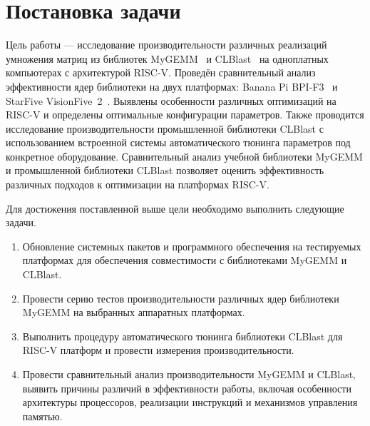 
\section{Постановка задачи}
\label{sec:task}

Цель работы --- исследование производительности различных реализаций умножения матриц из библиотек MyGEMM~\cite{mygemm_repo} и CLBlast~\cite{clblast} на одноплатных компьютерах с архитектурой RISC-V. Проведён сравнительный анализ эффективности ядер библиотеки на двух платформах: Banana Pi BPI-F3~\cite{bananapi_f3_wiki} и StarFive VisionFive~2~\cite{visionfive2_wiki}. Выявлены особенности различных оптимизаций на RISC-V и определены оптимальные конфигурации параметров. Также проводится исследование производительности промышленной библиотеки CLBlast с использованием встроенной системы автоматического тюнинга параметров под конкретное оборудование. Сравнительный анализ учебной библиотеки MyGEMM и промышленной библиотеки CLBlast позволяет оценить эффективность различных подходов к оптимизации на платформах RISC-V.

Для достижения поставленной выше цели необходимо выполнить следующие задачи.
\begin{enumerate}
    \item Обновление системных пакетов и программного обеспечения на тестируемых платформах для обеспечения совместимости с библиотеками MyGEMM и CLBlast.
    \item Провести серию тестов производительности различных ядер библиотеки MyGEMM на выбранных аппаратных платформах.
    \item Выполнить процедуру автоматического тюнинга библиотеки CLBlast для RISC-V платформ и провести измерения производительности.
    \item Провести сравнительный анализ производительности MyGEMM и CLBlast, выявить причины различий в эффективности работы, включая особенности архитектуры процессоров, реализации инструкций и механизмов управления памятью.
\end{enumerate}